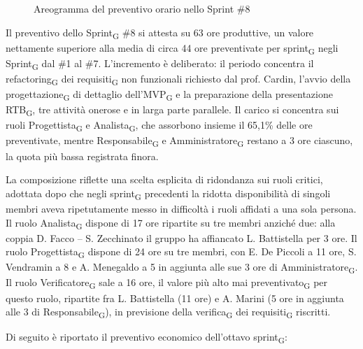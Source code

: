 ﻿\documentclass[a4paper, 10pt, colorlinks=true, linkcolor=black, urlcolor=blue, citecolor=blue, hidelinks]{article}
\begin{document}
\begin{figure}[H]

\caption{Areogramma del preventivo orario nello Sprint \#8}
\label{fig:preventivo-sprint8}
\end{figure}

Il preventivo dello Sprint\textsubscript{G} \#8 si attesta su 63 ore produttive, un valore nettamente superiore alla media di circa 44 ore preventivate per sprint\textsubscript{G} negli Sprint\textsubscript{G} dal \#1 al \#7. L'incremento è deliberato: il periodo concentra il refactoring\textsubscript{G} dei requisiti\textsubscript{G} non funzionali richiesto dal prof. Cardin, l'avvio della progettazione\textsubscript{G} di dettaglio dell'MVP\textsubscript{G} e la preparazione della presentazione RTB\textsubscript{G}, tre attività onerose e in larga parte parallele. Il carico si concentra sui ruoli Progettista\textsubscript{G} e Analista\textsubscript{G}, che assorbono insieme il 65,1\% delle ore preventivate, mentre Responsabile\textsubscript{G} e Amministratore\textsubscript{G} restano a 3 ore ciascuno, la quota più bassa registrata finora.

La composizione riflette una scelta esplicita di ridondanza sui ruoli critici, adottata dopo che negli sprint\textsubscript{G} precedenti la ridotta disponibilità di singoli membri aveva ripetutamente messo in difficoltà i ruoli affidati a una sola persona. Il ruolo Analista\textsubscript{G} dispone di 17 ore ripartite su tre membri anziché due: alla coppia D. Facco -- S. Zecchinato il gruppo ha affiancato L. Battistella per 3 ore. Il ruolo Progettista\textsubscript{G} dispone di 24 ore su tre membri, con E. De Piccoli a 11 ore, S. Vendramin a 8 e A. Menegaldo a 5 in aggiunta alle sue 3 ore di Amministratore\textsubscript{G}. Il ruolo Verificatore\textsubscript{G} sale a 16 ore, il valore più alto mai preventivato\textsubscript{G} per questo ruolo, ripartite fra L. Battistella (11 ore) e A. Marini (5 ore in aggiunta alle 3 di Responsabile\textsubscript{G}), in previsione della verifica\textsubscript{G} dei requisiti\textsubscript{G} riscritti.

Di seguito è riportato il preventivo economico dell'ottavo sprint\textsubscript{G}:
\end{document}
